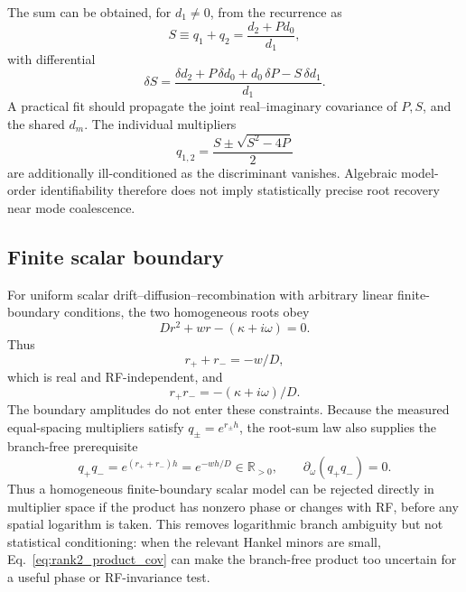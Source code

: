 \documentclass[11pt]{article}
\begin{document}
The sum can be obtained, for $d_1\neq0$, from the recurrence as
\begin{equation}
S\equiv q_1+q_2=\frac{d_2+P d_0}{d_1},
\end{equation}
with differential
\begin{equation}
\boxed{\delta S=\frac{\delta d_2+P\,\delta d_0+d_0\,\delta P-S\,\delta d_1}{d_1}.}
\label{eq:rank2_sum_delta}
\end{equation}
A practical fit should propagate the joint real--imaginary covariance of $P,S$, and the shared $d_m$.  The individual multipliers
\begin{equation}
q_{1,2}=\frac{S\pm\sqrt{S^2-4P}}{2}
\end{equation}
are additionally ill-conditioned as the discriminant vanishes.  Algebraic model-order identifiability therefore does not imply statistically precise root recovery near mode coalescence.

\subsection{Finite scalar boundary}

For uniform scalar drift--diffusion--recombination with arbitrary linear finite-boundary conditions, the two homogeneous roots obey
\begin{equation}
D r^2+w r-(\kappa+i\omega)=0.
\end{equation}
Thus
\begin{equation}
\boxed{r_++r_-=-w/D,}
\label{eq:rootsum}
\end{equation}
which is real and RF-independent, and
\begin{equation}
\boxed{r_+r_-=-(\kappa+i\omega)/D.}
\label{eq:rootprod}
\end{equation}
The boundary amplitudes do not enter these constraints. Because the measured equal-spacing multipliers satisfy $q_\pm=e^{r_\pm h}$, the root-sum law also supplies the branch-free prerequisite
\begin{equation}
\boxed{q_+q_-=e^{(r_++r_-)h}=e^{-wh/D}\in\mathbb{R}_{>0},\qquad \partial_\omega(q_+q_-)=0.}
\label{eq:multiplier_product_boundary}
\end{equation}
Thus a homogeneous finite-boundary scalar model can be rejected directly in multiplier space if the product has nonzero phase or changes with RF, before any spatial logarithm is taken. This removes logarithmic branch ambiguity but not statistical conditioning: when the relevant Hankel minors are small, Eq.~\eqref{eq:rank2_product_cov} can make the branch-free product too uncertain for a useful phase or RF-invariance test.
\end{document}
